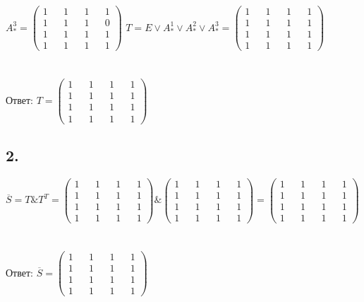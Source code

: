 \documentclass{article}
\begin{document}
$
A^{3}_{*} = 
\begin{pmatrix}
  1 && 1 && 1 && 1 \\
  1 && 1 && 1 && 0 \\
  1 && 1 && 1 && 1 \\
  1 && 1 && 1 && 1
\end{pmatrix}
$
\newpage
$
T = E \lor A^{1}_{*} \lor A^{2}_{*} \lor A^{3}_{*} = 
\begin{pmatrix}
  1 && 1 && 1 && 1 \\
  1 && 1 && 1 && 1 \\
  1 && 1 && 1 && 1 \\
  1 && 1 && 1 && 1
\end{pmatrix}
$
\\\\\\
Ответ:
$
T =
\begin{pmatrix}
  1 && 1 && 1 && 1 \\
  1 && 1 && 1 && 1 \\
  1 && 1 && 1 && 1 \\
  1 && 1 && 1 && 1
\end{pmatrix}
$

\subsection*{2.}
$\overline{S} = T \& T^{T} =
\begin{pmatrix}
  1 && 1 && 1 && 1 \\
  1 && 1 && 1 && 1 \\
  1 && 1 && 1 && 1 \\
  1 && 1 && 1 && 1
\end{pmatrix}
\&
\begin{pmatrix}
  1 && 1 && 1 && 1 \\
  1 && 1 && 1 && 1 \\
  1 && 1 && 1 && 1 \\
  1 && 1 && 1 && 1
\end{pmatrix}
=
\begin{pmatrix}
  1 && 1 && 1 && 1 \\
  1 && 1 && 1 && 1 \\
  1 && 1 && 1 && 1 \\
  1 && 1 && 1 && 1
\end{pmatrix}
$
\\\\\\
Ответ:
$
\overline{S} =
\begin{pmatrix}
  1 && 1 && 1 && 1 \\
  1 && 1 && 1 && 1 \\
  1 && 1 && 1 && 1 \\
  1 && 1 && 1 && 1
\end{pmatrix}
$
\end{document}
